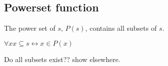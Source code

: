 
\subsection{Powerset function}

The power set of \(s\), \(P(s)\), contains all subsets of \(s\).

$\forall x x\subseteq s \leftrightarrow x\in P(x)$

Do all subsets exist?? show elsewhere.

